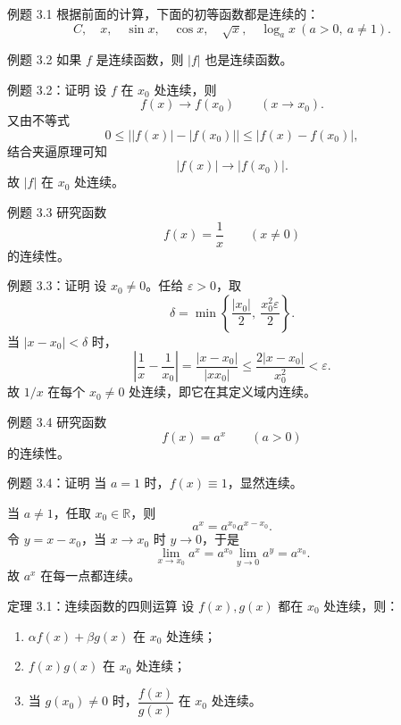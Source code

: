 ﻿\documentclass[aspectratio=169,11pt]{ctexbeamer}
\begin{document}
\begin{frame}{例题 3.1}
根据前面的计算，下面的初等函数都是连续的：
\[
  C,\quad x,\quad \sin x,\quad \cos x,\quad \sqrt{x},\quad \log_a x\ (a>0,\ a\ne 1).
\]
\end{frame}

\begin{frame}{例题 3.2}
如果 $f$ 是连续函数，则 $|f|$ 也是连续函数。
\end{frame}

\begin{frame}{例题 3.2：证明}
设 $f$ 在 $x_0$ 处连续，则
\[
  f(x)\to f(x_0)\qquad (x\to x_0).
\]
又由不等式
\[
  0\le \bigl||f(x)|-|f(x_0)|\bigr|\le |f(x)-f(x_0)|,
\]
结合夹逼原理可知
\[
  |f(x)|\to |f(x_0)|.
\]
故 $|f|$ 在 $x_0$ 处连续。
\end{frame}

\begin{frame}{例题 3.3}
研究函数
\[
  f(x)=\frac1x\qquad (x\ne 0)
\]
的连续性。
\end{frame}

\begin{frame}{例题 3.3：证明}
设 $x_0\ne 0$。任给 $\varepsilon>0$，取
\[
  \delta=\min\left\{\frac{|x_0|}{2},\ \frac{x_0^2\varepsilon}{2}\right\}.
\]
当 $|x-x_0|<\delta$ 时，
\[
  \left|\frac1x-\frac1{x_0}\right|
  =
  \frac{|x-x_0|}{|xx_0|}
  \le
  \frac{2|x-x_0|}{x_0^2}
  <\varepsilon.
\]
故 $1/x$ 在每个 $x_0\ne 0$ 处连续，即它在其定义域内连续。
\end{frame}

\begin{frame}{例题 3.4}
研究函数
\[
  f(x)=a^x\qquad (a>0)
\]
的连续性。
\end{frame}

\begin{frame}{例题 3.4：证明}
当 $a=1$ 时，$f(x)\equiv 1$，显然连续。

\vspace{0.6em}
当 $a\ne 1$，任取 $x_0\in\mathbb{R}$，则
\[
  a^x=a^{x_0}a^{x-x_0}.
\]
令 $y=x-x_0$，当 $x\to x_0$ 时 $y\to 0$，于是
\[
  \lim_{x\to x_0}a^x
  =
  a^{x_0}\lim_{y\to 0}a^y
  =
  a^{x_0}.
\]
故 $a^x$ 在每一点都连续。
\end{frame}

\begin{frame}{定理 3.1：连续函数的四则运算}
设 $f(x),g(x)$ 都在 $x_0$ 处连续，则：
\begin{enumerate}
  \item $\alpha f(x)+\beta g(x)$ 在 $x_0$ 处连续；
  \item $f(x)g(x)$ 在 $x_0$ 处连续；
  \item 当 $g(x_0)\ne 0$ 时，$\dfrac{f(x)}{g(x)}$ 在 $x_0$ 处连续。
\end{enumerate}
\end{frame}
\end{document}
